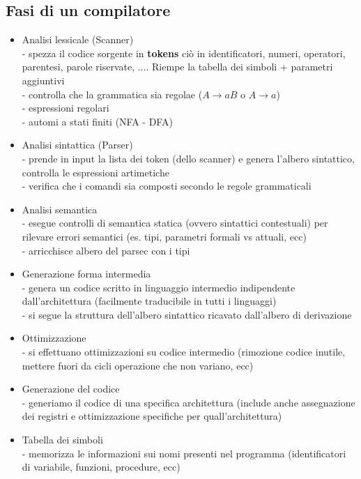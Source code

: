 \documentclass[a4paper,12pt]{article}
\begin{document}
\subsection{Fasi di un compilatore}
\begin{itemize}
  \item Analisi lessicale (Scanner) \\
  - spezza il codice sorgente in \textbf{tokens} ciò in identificatori, numeri, operatori, parentesi, parole riservate, $\dots$. Riempe la tabella dei simboli + parametri aggiuntivi \\
  - controlla che la grammatica sia regolae ($A \to aB$ o $A \to a$) \\
  - espressioni regolari \\
  - automi a stati finiti (NFA - DFA)
  \item Analisi sintattica (Parser) \\
  - prende in input la lista dei token (dello scanner) e genera l'albero sintattico, controlla le espressioni artimetiche \\
  - verifica che i comandi sia composti secondo le regole grammaticali
  \item Analisi semantica \\
  - esegue controlli di semantica statica (ovvero sintattici contestuali) per rilevare errori semantici (es. tipi, parametri formali vs attuali, ecc)\\
  - arricchisce albero del parsec con i tipi
  \item Generazione forma intermedia \\
  - genera un codice scritto in linguaggio intermedio indipendente dall'architettura (facilmente traducibile in tutti i linguaggi) \\
  - si segue la struttura dell'albero sintattico ricavato dall'albero di derivazione
  \item Ottimizzazione \\
  - si effettuano ottimizzazioni su codice intermedio (rimozione codice inutile, mettere fuori da cicli operazione che non variano, ecc)
  \item Generazione del codice \\
  - generiamo il codice di una specifica architettura (include anche assegnazione dei registri e ottimizzazione specifiche per quall'architettura)
  \item Tabella dei simboli \\
  - memorizza le informazioni sui nomi presenti nel programma (identificatori di variabile, funzioni, procedure, ecc)
\end{itemize}
\end{document}
